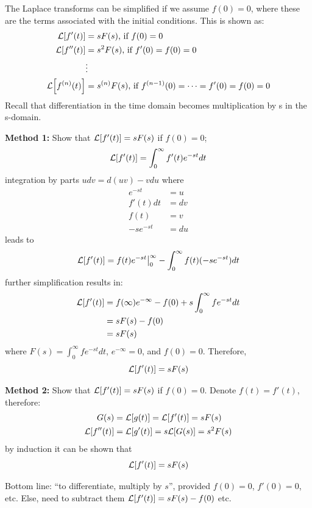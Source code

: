 \documentclass[12pt,letter]{article}
\begin{document}
The Laplace transforms can be simplified if we assume $ f(0) = 0$, where these are the terms associated with the initial conditions. This is shown as:
\begin{align}
\mathcal{L}{\left[f'(t)\right]} &= sF(s) \text{, if } f(0) = 0   \\
\mathcal{L}{\left[f''(t)\right]} &= s^2F(s) \text{, if } f'(0) = f(0) = 0  \nonumber \\
&\vdots  \nonumber \\
\mathcal{L}{\left[f^{(n)}(t)\right]} &= s^{(n)}F(s) \text{, if } f^{(n-1)}(0) = \cdots = f'(0) = f(0) = 0 \nonumber  
\end{align}
Recall that differentiation in the time domain becomes multiplication by s in the s-domain.


\begin{mdframed}[middlelinewidth=0.5mm]
\begin{center}
\end{center}

\noindent \textbf{Method 1:}
Show that $\mathcal{L}{\left[f'(t)\right]} = s F(s)$ if $f(0) = 0$;
\begin{equation}
\mathcal{L}{\left[f'(t)\right]} = \int_{0}^{\infty} f'(t)e^{-st}dt 
\end{equation}
integration by parts $udv = d(uv) -vdu$ where
\begin{align}
e^{-st} &= u   \\
f'(t)dt &= dv  \nonumber \\
f(t) &= v  \nonumber \\
-se^{-st} &= du   \nonumber
\end{align}
leads to
\begin{equation}
\mathcal{L}{\left[f'(t)\right]} = f(t)e^{-st}\big|_{0}^{\infty} - \int_{0}^{\infty}f(t)(-se^{-st})dt
\end{equation}
further simplification results in:
\begin{align}
\mathcal{L}{\left[f'(t)\right]} &= f(\infty)e^{- \infty} - f(0) + s \int_{0}^{\infty} f e^{-s t} dt   \\
 &= s F(s) -f(0)  \nonumber \\
 &= s F(s)  \nonumber
\end{align}
where $F(s) = \int_{0}^{\infty} f e^{-s t} dt$, $e^{- \infty}=0$, and $f(0) = 0$. Therefore, 
\begin{equation}
\mathcal{L}{\left[f'(t)\right]} = s F(s)
\end{equation}

\noindent \textbf{Method 2:}
Show that $\mathcal{L}{\left[f'(t)\right]} = s F(s)$ if $f(0) = 0$. Denote $f(t) = f'(t)$, therefore:
\begin{align}
G(s) &= \mathcal{L}{\left[g(t)\right]} = \mathcal{L}{\left[f'(t)\right]} = sF(s)  \\
\mathcal{L}{\left[f''(t)\right]} &= \mathcal{L}{\left[g'(t)\right]} = s\mathcal{L}{\left[G(s)\right]} = s^2F(s)  \nonumber
\end{align}
by induction it can be shown that 
\begin{equation}
\mathcal{L}{\left[f'(t)\right]} = s F(s)
\end{equation}

Bottom line: ``to differentiate, multiply by $s$'', provided $f(0) =0$, $f'(0) =0$, etc. Else, need to subtract them $\mathcal{L}{\left[f'(t)\right]} = sF(s) -f(0)$ etc. 
\end{mdframed}
\end{document}
